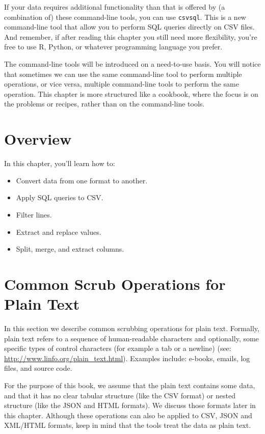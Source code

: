 \documentclass[
]{book}
\theoremstyle{definition}
\theoremstyle{definition}
\theoremstyle{definition}
\theoremstyle{remark}
\begin{document}
If your data requires additional functionality than that is offered by (a combination of) these command-line tools, you can use \texttt{csvsql}. This is a new command-line tool that allow you to perform SQL queries directly on CSV files. And remember, if after reading this chapter you still need more flexibility, you're free to use R, Python, or whatever programming language you prefer.

The command-line tools will be introduced on a need-to-use basis. You will notice that sometimes we can use the same command-line tool to perform multiple operations, or vice versa, multiple command-line tools to perform the same operation. This chapter is more structured like a cookbook, where the focus is on the problems or recipes, rather than on the command-line tools.

\hypertarget{overview}{%
\section{Overview}\label{overview}}

In this chapter, you'll learn how to:

\begin{itemize}
\item
  Convert data from one format to another.
\item
  Apply SQL queries to CSV.
\item
  Filter lines.
\item
  Extract and replace values.
\item
  Split, merge, and extract columns.
\end{itemize}

\hypertarget{common-scrub-operations-for-plain-text}{%
\section{Common Scrub Operations for Plain Text}\label{common-scrub-operations-for-plain-text}}

In this section we describe common scrubbing operations for plain text. Formally, plain text refers to a sequence of human-readable characters and optionally, some specific types of control characters (for example a tab or a newline) (see: \url{http://www.linfo.org/plain_text.html}). Examples include: e-books, emails, log files, and source code.

For the purpose of this book, we assume that the plain text contains some data, and that it has no clear tabular structure (like the CSV format) or nested structure (like the JSON and HTML formats). We discuss those formats later in this chapter. Although these operations can also be applied to CSV, JSON and XML/HTML formats, keep in mind that the tools treat the data as plain text.
\end{document}
